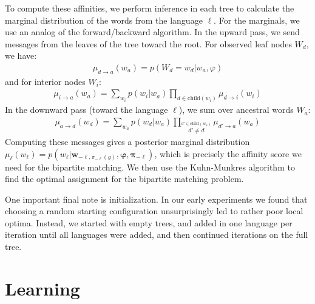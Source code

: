 \documentclass[11pt,a4paper]{article}
\begin{document}
To compute these affinities, we perform
inference in each tree to calculate the marginal distribution of
the words from the language $\ell$. For the marginals, we use an
analog of the forward/backward algorithm. In the upward pass, we
send messages from the leaves of the tree toward the root. For
observed leaf nodes $W_d$, we have:
\begin{equation*}
  \begin{split}
    \mu_{d\to a}(w_a) = p(W_d = w_d|w_a,\varphi)
   \end{split}
 \end{equation*}
and for interior nodes $W_i$:
\begin{equation}
  \label{eqn:summing}
  \begin{split}
    \mu_{i\to a}(w_a) = \sum_{w_i} p(w_i|w_a) \prod_{d \in \mathrm{child}(w_i)} \mu_{d \to i}(w_i) 
  \end{split}
\end{equation}
In the downward pass (toward the language $\ell$), we sum over ancestral words $W_a$:
\begin{equation*}
  \begin{split}
    \mu_{a\to d}(w_d) = \sum_{w_a} p(w_d|w_a) \prod_{\stackrel{d' \in \mathrm{child}(w_a)}{d' \neq d}} \mu_{d' \to a}(w_a) 
  \end{split}
\end{equation*}
Computing these messages gives a posterior marginal distribution
$\mu_\ell(w_\ell) = p(w_\ell|\mathbf w_{-\ell,\pi_{-\ell}(g)},\mathbf \varphi,\mathbf\pi_{-\ell})$,
which is precisely the affinity score
we need for the bipartite matching. We then use the Kuhn-Munkres
algorithm \cite{Kuhn1955} to find the optimal assignment for the
bipartite matching problem.

One important final note is initialization. In our early experiments
we found that choosing a random starting configuration unsurprisingly led
to rather poor local optima. Instead, we started with empty trees,
and added in one language per iteration until all languages were
added, and then continued iterations on the full tree.

\section{Learning}
\end{document}
